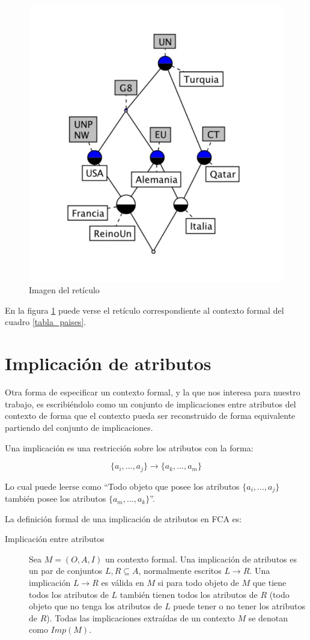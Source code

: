 	\begin{figure}
		\centering
		\includegraphics[width=0.5\linewidth]{02_FCA/reticulo}
		\caption{Imagen del retículo}
		\label{reticulo}
	\end{figure}

	En la figura \ref{reticulo} puede verse el retículo correspondiente al contexto formal del cuadro \ref{tabla_paises}.
	
	
	
\section*{Implicación de atributos}

	Otra forma de especificar un contexto formal, y la que nos interesa para nuestro trabajo, es escribiéndolo como un conjunto de implicaciones entre atributos del contexto de forma que el contexto pueda ser reconstruido de forma equivalente partiendo del conjunto de implicaciones. 
	
	Una implicación es una restricción sobre los atributos con la forma: 
	
	\[ \{a_i,...,a_j\} \rightarrow \{a_k,...,a_m\} \]
	
	Lo cual puede leerse como ``Todo objeto que posee los atributos $\{a_i,...,a_j\}$ también posee los atributos $\{a_m,...,a_k\}$''.
	
	La definición formal de una implicación de atributos en FCA es: 
	
	\begin{description}
		\item[Implicación entre atributos] Sea $M = (O,A,I)$ un contexto formal. Una implicación de atributos es un par de conjuntos $L, R \subseteq A$, normalmente escritos $L \rightarrow R$. Una implicación $L \rightarrow R$ es válida en $M$ si para todo objeto de $M$ que tiene todos los atributos de $L$ también tienen todos los atributos de $R$ (todo objeto que no tenga los atributos de $L$ puede tener o no tener los atributos de $R$). Todas las implicaciones extraídas de un contexto $M$ se denotan como $Imp(M)$.
	\end{description}
	
